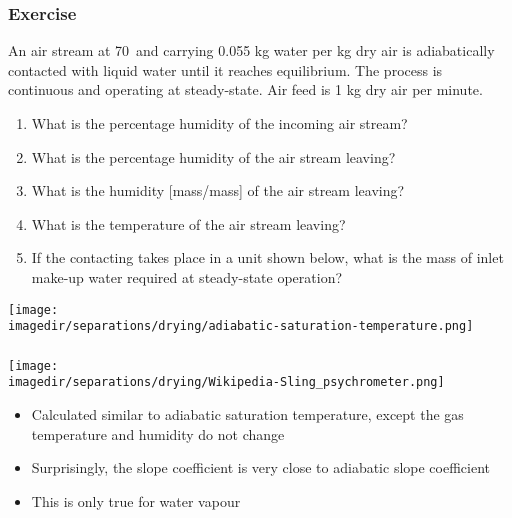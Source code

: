 \begin{frame}\frametitle{Exercise}
	An air stream at 70\degC$\,$ and carrying 0.055 kg water per kg dry air is adiabatically contacted with liquid water until it reaches equilibrium. The process is continuous and operating at steady-state. Air feed is 1 kg dry air per minute.
	{\small
	\begin{enumerate}
		\item	What is the percentage humidity of the incoming air stream? {\color{myOrange}{[20\%]}}
		\item	What is the percentage humidity of the air stream leaving?  {\color{myOrange}{[100\%]}}
		\item	What is the humidity [mass/mass] of the air stream leaving? {\scriptsize{\color{myOrange}{[66g/kg]}}}
		\item	What is the temperature of the air stream leaving? {\color{myOrange}{[45\degC]}}
		\item	If the contacting takes place in a unit shown below, what is the mass of inlet make-up water required at steady-state operation? {\color{myOrange}{[$(66-55) = 11$ g per min]}}
	\end{enumerate}}

	\vspace{-12pt}
	\hfill\texttt{[image: \\imagedir/separations/drying/adiabatic-saturation-temperature.png]}
	
\end{frame}

\begin{frame}\frametitle{{\color{purple}{Wet-bulb temperature}}}
	\begin{center}
		\texttt{[image: \\imagedir/separations/drying/Wikipedia-Sling\_psychrometer.png]}
	\end{center}
	\vspace{-6pt}
	\vspace{6pt}
	\begin{itemize}
		\item	Calculated similar to adiabatic saturation temperature, except the gas temperature and humidity do not change
		\item	Surprisingly, the slope coefficient is very close to adiabatic slope coefficient
		\item	This is only true for water vapour
	\end{itemize}
\end{frame}

